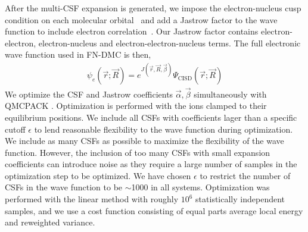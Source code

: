 \documentclass[pra,superscriptaddress,groupedaddress,twocolumn]{revtex4}
\begin{document}
After the multi-CSF expansion is generated, we impose the electron-nucleus cusp condition on each molecular orbital~\cite{cusp} and add a Jastrow factor to the wave function to include electron correlation~\cite{Kato}. Our Jastrow factor contains electron-electron, electron-nucleus and electron-electron-nucleus terms. The full electronic wave function used in FN-DMC is then,
\begin{align}
\psi_e(\vec{r};\vec{R})=e^{J(\vec{r},\vec{R},\vec{\beta})}\Psi_{\text{CISD}}(\vec{r};\vec{R})\label{eq:psie}
\end{align}
We optimize the CSF and Jastrow coefficients $\vec{\alpha},\vec{\beta}$ simultaneously with QMCPACK \cite{QMCPACK}. Optimization is performed with the ions clamped to their equilibrium positions. We include all CSFs with coefficients lager than a specific cutoff $\epsilon$ to lend reasonable flexibility to the wave function during optimization. We include as many CSFs as possible to maximize the flexibility of the wave function. However, the inclusion of too many CSFs with small expansion coefficients can introduce noise as they require a large number of samples in the optimization step to be optimized. We have chosen $\epsilon$ to restrict the number of CSFs in the wave function to be $\sim$1000 in all systems. Optimization was performed with the linear method with roughly $10^6$ statistically independent samples, and we use a cost function consisting of equal parts average local energy and reweighted variance. 
\end{document}
